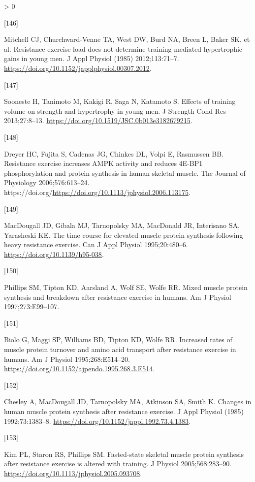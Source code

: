 \documentclass[twoside,10pt]{gihclass} %
\newlength{\cslhangindent}
\newlength{\csllabelwidth}
\newenvironment{CSLReferences}[3] %
 {%
  \setlength{\parindent}{0pt}
  \ifodd #1 \everypar{\setlength{\hangindent}{\cslhangindent}}\ignorespaces\fi
  \ifnum #2 > 0
  \setlength{\parskip}{#2\baselineskip}
  \fi
 }%
 {}
\newcommand{\CSLLeftMargin}[1]{\parbox[t]{\maxof{\widthof{#1}}{\csllabelwidth}}{#1}}
\newcommand{\CSLRightInline}[1]{\parbox[t]{\linewidth}{#1}}
\begin{document}
\begin{CSLReferences}{0}{0}
\leavevmode\hypertarget{ref-RN834}{}%
\CSLLeftMargin{{[}146{]} }
\CSLRightInline{Mitchell CJ, Churchward-Venne TA, West DW, Burd NA, Breen L, Baker SK, et al. Resistance exercise load does not determine training-mediated hypertrophic gains in young men. J Appl Physiol (1985) 2012;113:71--7. \url{https://doi.org/10.1152/japplphysiol.00307.2012}.}

\leavevmode\hypertarget{ref-RN1607}{}%
\CSLLeftMargin{{[}147{]} }
\CSLRightInline{Sooneste H, Tanimoto M, Kakigi R, Saga N, Katamoto S. Effects of training volume on strength and hypertrophy in young men. J Strength Cond Res 2013;27:8--13. \url{https://doi.org/10.1519/JSC.0b013e3182679215}.}

\leavevmode\hypertarget{ref-RN2710}{}%
\CSLLeftMargin{{[}148{]} }
\CSLRightInline{Dreyer HC, Fujita S, Cadenas JG, Chinkes DL, Volpi E, Rasmussen BB. Resistance exercise increases AMPK activity and reduces 4E-BP1 phosphorylation and protein synthesis in human skeletal muscle. The Journal of Physiology 2006;576:613--24. https://doi.org/\url{https://doi.org/10.1113/jphysiol.2006.113175}.}

\leavevmode\hypertarget{ref-RN2711}{}%
\CSLLeftMargin{{[}149{]} }
\CSLRightInline{MacDougall JD, Gibala MJ, Tarnopolsky MA, MacDonald JR, Interisano SA, Yarasheski KE. The time course for elevated muscle protein synthesis following heavy resistance exercise. Can J Appl Physiol 1995;20:480--6. \url{https://doi.org/10.1139/h95-038}.}

\leavevmode\hypertarget{ref-RN786}{}%
\CSLLeftMargin{{[}150{]} }
\CSLRightInline{Phillips SM, Tipton KD, Aarsland A, Wolf SE, Wolfe RR. Mixed muscle protein synthesis and breakdown after resistance exercise in humans. Am J Physiol 1997;273:E99--107.}

\leavevmode\hypertarget{ref-RN2712}{}%
\CSLLeftMargin{{[}151{]} }
\CSLRightInline{Biolo G, Maggi SP, Williams BD, Tipton KD, Wolfe RR. Increased rates of muscle protein turnover and amino acid transport after resistance exercise in humans. Am J Physiol 1995;268:E514--20. \url{https://doi.org/10.1152/ajpendo.1995.268.3.E514}.}

\leavevmode\hypertarget{ref-RN2717}{}%
\CSLLeftMargin{{[}152{]} }
\CSLRightInline{Chesley A, MacDougall JD, Tarnopolsky MA, Atkinson SA, Smith K. Changes in human muscle protein synthesis after resistance exercise. J Appl Physiol (1985) 1992;73:1383--8. \url{https://doi.org/10.1152/jappl.1992.73.4.1383}.}

\leavevmode\hypertarget{ref-RN1521}{}%
\CSLLeftMargin{{[}153{]} }
\CSLRightInline{Kim PL, Staron RS, Phillips SM. Fasted-state skeletal muscle protein synthesis after resistance exercise is altered with training. J Physiol 2005;568:283--90. \url{https://doi.org/10.1113/jphysiol.2005.093708}.}


\end{CSLReferences}
\end{document}
